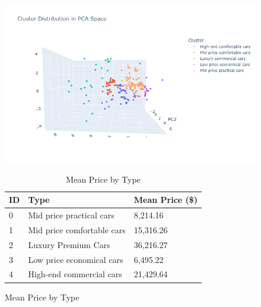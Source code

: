 \documentclass{article}
\begin{document}
\begin{figure}[H]
    \centering
    \begin{minipage}{0.5\textwidth}
        \centering
        \includegraphics[width=1\textwidth]{image/paper/kmeans.png}
        \caption{PCA Visualization}
        \label{pca1}
    \end{minipage}\hfill
    \begin{minipage}{0.5\textwidth}
        \begin{table}[H]
            \centering
            \small
            \caption{Mean Price by Type}
            \begin{tabular}{lll}
                \toprule
                \textbf{ID} & \textbf{Type}              & \textbf{Mean Price (\$)} \\
                \midrule
                0           & Mid price practical cars   & 8,214.16                 \\
                1           & Mid price comfortable cars & 15,316.26                \\
                2           & Luxury Premium Cars        & 36,216.27                \\
                3           & Low price economical cars  & 6,495.22                 \\
                4           & High-end commercial cars   & 21,429.64                \\
                \bottomrule
            \end{tabular}
        \end{table}
    \end{minipage}
\end{figure}
\end{document}
